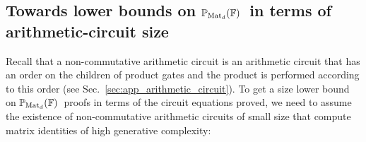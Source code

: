 \documentclass[12pt,reqno]{article}
\newcommand\F{\ensuremath{\mathbb F}}
\newcommand\PP{{\mathbb P}}
\newcommand\PC{\ensuremath{\PP_c}}
\newcommand\PMd{\ensuremath{\PP_{{\rm Mat}_d}(\F)}}
\newcommand{\cd}{\cdot}
\newcommand{\matd}{{\ensuremath{{\rm Mat}_d(\F)}}}
\begin{document}

%



\subsection{Towards lower bounds on \PMd\ in terms of arithmetic-circuit size}\label{sec:ovrv:fragment-lower-bounds}





Recall that a non-commutative arithmetic circuit is an arithmetic circuit that has an order on the children of product gates and the product is performed according to this order (see Sec.~\ref{sec:app_arithmetic_circuit}).
To get a size lower bound on \PMd\ proofs in terms of the circuit equations proved, we need to assume the existence of non-commutative arithmetic circuits of small size that compute matrix identities of high generative complexity:
\end{document}
